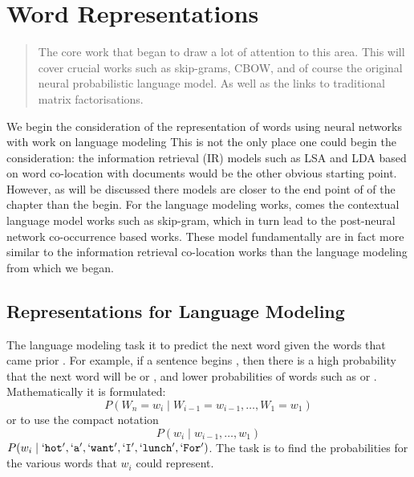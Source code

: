 \documentclass[parskip]{komatufte}
\begin{document}
\chapter{Word Representations}\label{sec:word-representations}
\begin{abstract}
The core work that began to draw a lot of attention to this area.
This will cover crucial works such as skip-grams, CBOW, and of course the original neural probabilistic language model.
As well as the links to traditional matrix factorisations.
\end{abstract}

We begin the consideration of the representation of words using neural networks with work on language modeling
This is not the only place one could begin the consideration: the information retrieval (IR) models such as LSA  and LDA  based on word co-location with documents would be the other obvious starting point.
However, as will be discussed there models are closer to the end point of of the chapter than the begin.
For the language modeling works, comes the contextual language model works such as skip-gram, which in turn lead to the post-neural network co-occurrence based works.
These model fundamentally are in fact more similar to the information retrieval co-location works than the language modeling from which we began.


\section{Representations for Language Modeling}


The language modeling task it to predict the next word given the words that came prior .
For example, if a sentence begins , then there is a high probability that the next word will be  or ,
and lower probabilities of words such as  or .
Mathematically it is formulated: 
\begin{equation}\label{equ:langmodel}
	P(W_n{=}w_i \mid W_{i-1}{=}w_{i-1}, \ldots, W_1{=}w_1)
\end{equation}
or to use the compact notation 
\begin{equation}\label{equ:langmodelcompact}
P(w_i \mid w_{i-1}, \ldots, w_1)
\end{equation}
$P(w_i \mid `\texttt{hot}', `\texttt{a}', `\texttt{want}', `\texttt{I}', `\texttt{lunch}', `\texttt{For}')$.
The task is to find the probabilities for the various words that $w_i$ could represent.
\end{document}
